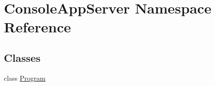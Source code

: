 \hypertarget{namespace_console_app_server}{}\section{Console\+App\+Server Namespace Reference}
\label{namespace_console_app_server}
\subsection*{Classes}
\begin{DoxyCompactItemize}
\item 
class \mbox{\hyperlink{class_console_app_server_1_1_program}{Program}}
\end{DoxyCompactItemize}
